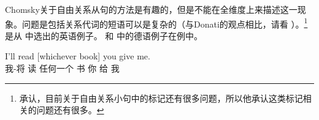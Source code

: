 
Chomsky关于自由关系从句的方法是有趣的，但是不能在全维度上来描述这一现象。问题是包括关系代词的短语可以是复杂的（与Donati的观点相比，请看 ）。\footnote{%
 \citet[]{Chomsky2013a}承认，目前关于自由关系小句中的标记还有很多问题，所以他承认这类标记相关的问题还有很多。
} 是从 \citet[]{BG78}中选出的英语例子。 和  中的德语例子在例中。

\ea
\gll I'll read [whichever book] you give me.\\
     我-将 读   \spacebr{}任何一个 书 你 给 我\\
\z

